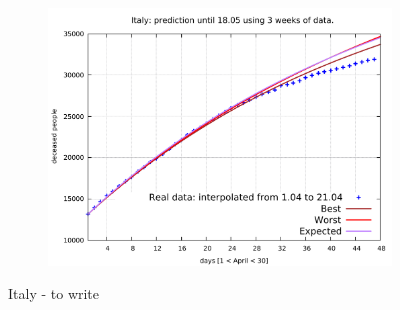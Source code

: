\documentclass[8pt]{article}
\begin{document}
\begin{figure}[h!]
\begin{subfigure}[b]{0.45\linewidth}
  \includegraphics[width=\linewidth]{../simulations/it/1-21/1-21.pdf}
  \end{subfigure}
	\caption{Italy - to write}
\end{figure}
\end{document}
